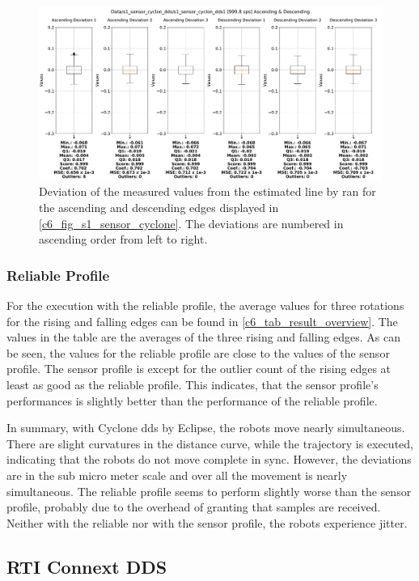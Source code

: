 \begin{figure}[H]
	\centering
	\includegraphics[width=1\textwidth]{Figures/c6/s1/s1_sensor_cyclone_dds_1_box_aio.pdf}
	\caption{Deviation of the measured values from the estimated line by \gls{ran} for the ascending and descending edges displayed in \autoref{c6_fig_s1_sensor_cyclone}. The deviations are numbered in ascending order from left to right.}
	\label{c6_fig_s1_sensor_cyclone_box_aio}
\end{figure}
\subsubsection{Reliable Profile}
For the execution with the reliable profile, the average values for three rotations for the rising and falling edges can be found in \autoref{c6_tab_result_overview}. The values in the table are the averages of the three rising and falling edges. As can be seen, the values for the reliable profile are close to the values of the sensor profile. The sensor profile is except for the outlier count of the rising edges at least as good as the reliable profile. This indicates, that the sensor profile's performances is slightly better than the performance of the reliable profile.


In summary, with Cyclone \gls{dds} by Eclipse, the robots move nearly simultaneous. There are slight curvatures in the distance curve, while the trajectory is executed, indicating that the robots do not move complete in sync. However, the deviations are in the sub micro meter scale and over all the movement is nearly simultaneous. The reliable profile seems to perform slightly worse than the sensor profile, probably due to the overhead of granting that samples are received. Neither with the reliable nor with the sensor profile, the robots experience jitter.
\subsection{RTI Connext DDS}

